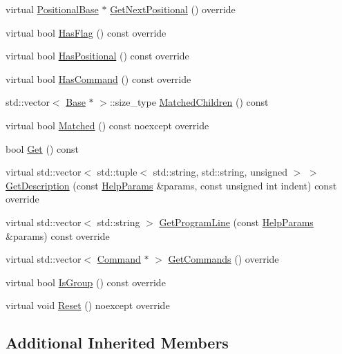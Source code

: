 \begin{DoxyCompactItemize}
\item 
virtual \hyperlink{classargs_1_1_positional_base}{Positional\+Base} $\ast$ \hyperlink{classargs_1_1_group_ae0fa8f5ae77fda45086e7815617ddff7}{Get\+Next\+Positional} () override
\item 
virtual bool \hyperlink{classargs_1_1_group_a67e35305748038c175dee92ad1f5290f}{Has\+Flag} () const override
\item 
virtual bool \hyperlink{classargs_1_1_group_a3d976f35f65ed8e4908eb88ce84accd4}{Has\+Positional} () const override
\item 
virtual bool \hyperlink{classargs_1_1_group_a022cbdf1f4bfe4210a56fa8ca9045bf8}{Has\+Command} () const override
\item 
std\+::vector$<$ \hyperlink{classargs_1_1_base}{Base} $\ast$ $>$\+::size\+\_\+type \hyperlink{classargs_1_1_group_a63697db6c1a28632775f852afface1ce}{Matched\+Children} () const
\item 
virtual bool \hyperlink{classargs_1_1_group_a7794d31edae97254be440b8768db9af0}{Matched} () const noexcept override
\item 
bool \hyperlink{classargs_1_1_group_ad95fc2e1615bd75cdffdad82daa67df4}{Get} () const
\item 
virtual std\+::vector$<$ std\+::tuple$<$ std\+::string, std\+::string, unsigned $>$ $>$ \hyperlink{classargs_1_1_group_a57068f355d7d62316b41f7a8e2528495}{Get\+Description} (const \hyperlink{structargs_1_1_help_params}{Help\+Params} \&params, const unsigned int indent) const override
\item 
virtual std\+::vector$<$ std\+::string $>$ \hyperlink{classargs_1_1_group_abe9ab07499ec19e941df8f38e18089df}{Get\+Program\+Line} (const \hyperlink{structargs_1_1_help_params}{Help\+Params} \&params) const override
\item 
virtual std\+::vector$<$ \hyperlink{classargs_1_1_command}{Command} $\ast$ $>$ \hyperlink{classargs_1_1_group_a83b0a40e16d92c0f387d00a0f35dbf17}{Get\+Commands} () override
\item 
virtual bool \hyperlink{classargs_1_1_group_a60de0a1db5be506a8638af0d3ce329bc}{Is\+Group} () const override
\item 
virtual void \hyperlink{classargs_1_1_group_a7ccee0f0ea0902b82029b2ab30f3f84b}{Reset} () noexcept override
\end{DoxyCompactItemize}
\subsection*{Additional Inherited Members}


